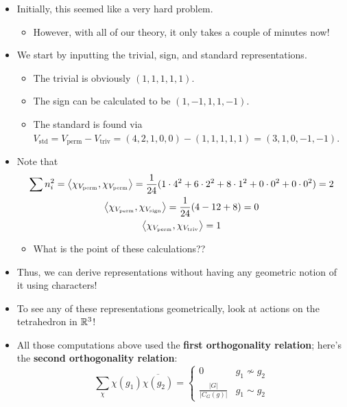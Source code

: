 \documentclass[../notes.tex]{subfiles}
\begin{document}
\begin{itemize}
\begin{itemize}
        \item Initially, this seemed like a very hard problem.
        \begin{itemize}
            \item However, with all of our theory, it only takes a couple of minutes now!
        \end{itemize}
        \item We start by inputting the trivial, sign, and standard representations.
        \begin{itemize}
            \item The trivial is obviously $(1,1,1,1,1)$.
            \item The sign can be calculated to be $(1,-1,1,1,-1)$.
            \item The standard is found via $V_\text{std}=V_\text{perm}-V_\text{triv}=(4,2,1,0,0)-(1,1,1,1,1)=(3,1,0,-1,-1)$.
        \end{itemize}
        \item Note that
        \begin{gather*}
            \sum n_i^2 = \left\langle{\chi_{V_\text{perm}},\chi_{V_\text{perm}}}\right\rangle
                = \frac{1}{24}(1\cdot 4^2+6\cdot 2^2+8\cdot 1^2+0\cdot 0^2+0\cdot 0^2)
                = 2\\
            \left\langle{\chi_{V_\text{perm}},\chi_{V_\text{sign}}}\right\rangle = \frac{1}{24}(4-12+8)
                = 0\\
            \left\langle{\chi_{V_\text{perm}},\chi_{V_\text{triv}}}\right\rangle = 1
        \end{gather*}
        \begin{itemize}
            \item What is the point of these calculations??
        \end{itemize}
        \item Thus, we can derive representations without having any geometric notion of it using characters!
        \item To see any of these representations geometrically, look at actions on the tetrahedron in $\mathbb{R}^3$!
        \item All those computations above used the \textbf{first orthogonality relation}; here's the \textbf{second orthogonality relation}:
        \begin{equation*}
            \sum_\chi\chi(g_1)\overline{\chi(g_2)} =
            \begin{cases}
                0 & g_1\nsim g_2\\
                \frac{|G|}{|C_G(g)|} & g_1\sim g_2

\end{cases}
\end{equation*}
\end{itemize}
\end{itemize}
\end{document}
